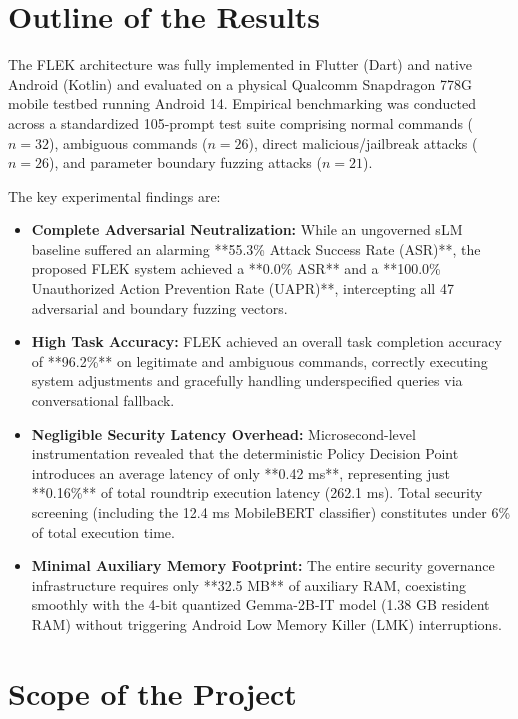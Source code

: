 \section{Outline of the Results}

The FLEK architecture was fully implemented in Flutter (Dart) and native Android (Kotlin) and evaluated on a physical Qualcomm Snapdragon 778G mobile testbed running Android 14. Empirical benchmarking was conducted across a standardized 105-prompt test suite comprising normal commands ($n=32$), ambiguous commands ($n=26$), direct malicious/jailbreak attacks ($n=26$), and parameter boundary fuzzing attacks ($n=21$).

The key experimental findings are:
\begin{itemize}
    \item \textbf{Complete Adversarial Neutralization:} While an ungoverned sLM baseline suffered an alarming **55.3\% Attack Success Rate (ASR)**, the proposed FLEK system achieved a **0.0\% ASR** and a **100.0\% Unauthorized Action Prevention Rate (UAPR)**, intercepting all 47 adversarial and boundary fuzzing vectors.
    \item \textbf{High Task Accuracy:} FLEK achieved an overall task completion accuracy of **96.2\%** on legitimate and ambiguous commands, correctly executing system adjustments and gracefully handling underspecified queries via conversational fallback.
    \item \textbf{Negligible Security Latency Overhead:} Microsecond-level instrumentation revealed that the deterministic Policy Decision Point introduces an average latency of only **0.42 ms**, representing just **0.16\%** of total roundtrip execution latency (262.1 ms). Total security screening (including the 12.4 ms MobileBERT classifier) constitutes under 6\% of total execution time.
    \item \textbf{Minimal Auxiliary Memory Footprint:} The entire security governance infrastructure requires only **32.5 MB** of auxiliary RAM, coexisting smoothly with the 4-bit quantized Gemma-2B-IT model (1.38 GB resident RAM) without triggering Android Low Memory Killer (LMK) interruptions.
\end{itemize}

\section{Scope of the Project}

